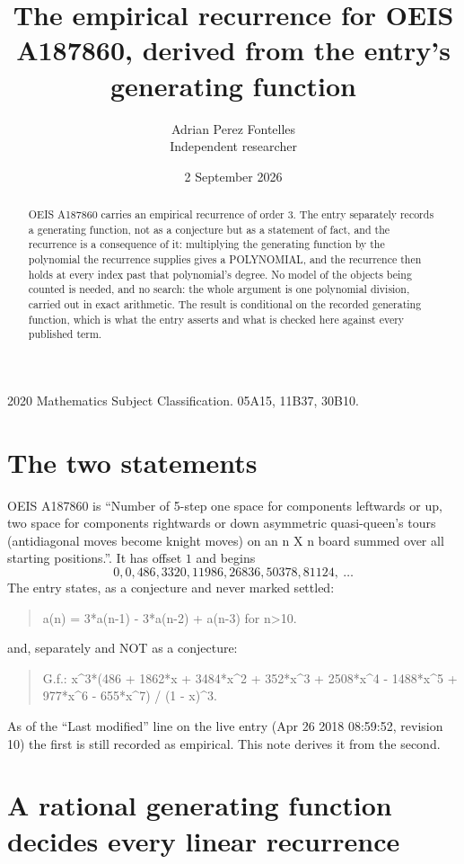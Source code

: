 \documentclass[11pt,a4paper]{article}
\title{The empirical recurrence for OEIS A187860, derived from the entry's generating function}
\author{Adrian Perez Fontelles\\ \small Independent researcher}
\date{2 September 2026}
\theoremstyle{plain}
\theoremstyle{definition}
\begin{document}
\maketitle

\begin{abstract}
OEIS A187860 carries an empirical recurrence of order $3$. The entry separately records a
generating function, not as a conjecture but as a statement of fact, and the recurrence is a
consequence of it: multiplying the generating function by the polynomial the recurrence
supplies gives a POLYNOMIAL, and the recurrence then holds at every index past that
polynomial's degree. No model of the objects being counted is needed, and no search: the
whole argument is one polynomial division, carried out in exact arithmetic. The result is
conditional on the recorded generating function, which is what the entry asserts and what is
checked here against every published term.
\end{abstract}

\noindent\small 2020 Mathematics Subject Classification. 05A15, 11B37, 30B10.\normalsize

\section{The two statements}

OEIS A187860 is ``Number of 5-step one space for components leftwards or up, two space for components rightwards or down asymmetric quasi-queen's tours (antidiagonal moves become knight moves) on an n X n board summed over all starting positions.''. It has offset $1$ and begins
\[
0, 0, 486, 3320, 11986, 26836, 50378, 81124,\ \dots
\]
The entry states, as a conjecture and never marked settled:
\begin{quote}
a(n) = 3*a(n-1) - 3*a(n-2) + a(n-3) for n>10.
\end{quote}
and, separately and NOT as a conjecture:
\begin{quote}
G.f.: x\^{}3*(486 + 1862*x + 3484*x\^{}2 + 352*x\^{}3 + 2508*x\^{}4 - 1488*x\^{}5 + 977*x\^{}6 - 655*x\^{}7) / (1 - x)\^{}3.
\end{quote}
As of the ``Last modified'' line on the live entry (Apr 26 2018 08:59:52, revision 10) the first is still
recorded as empirical. This note derives it from the second.

\section{A rational generating function decides every linear recurrence}
\end{document}
